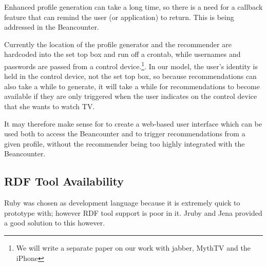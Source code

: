 \documentclass[]{article}
\begin{document}
Enhanced profile generation can take a long time, so there is a need for a callback feature that can remind the user (or application) to return. This is being addressed in the Beancounter.

Currently the location of the profile generator and the recommender are hardcoded into the set top box and run off a crontab, while usernames and passwords are passed from a control device.\footnote{We will write a separate paper on our work with jabber, MythTV and the iPhone}.  In our model, the user's identity is held in the control device, not the set top box, so because recommendations can also take a while to generate, it will take a while for recommendations to become available if they are only triggered when the user indicates on the control device that she wants to watch TV.

It may therefore make sense for to create a web-based user interface which can be used both to access the Beancounter and to trigger recommendations from a given profile, without the recommender being too highly integrated with the Beancounter.

\subsection{RDF Tool Availability}

Ruby was chosen as development language because it is extremely quick to prototype with; however RDF tool support is poor in it. Jruby and Jena provided a good solution to this however.
\end{document}
